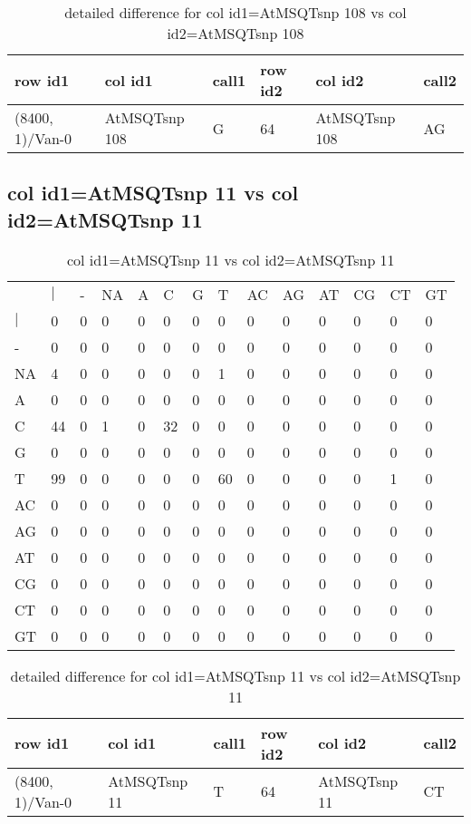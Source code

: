 \begin{center}
\begin{longtable}{|l|l|l|l|l|l|}
\caption{detailed difference for col id1=AtMSQTsnp 108 vs col id2=AtMSQTsnp 108} \label{table_dm495}\\
\hline
row id1&col id1&call1&row id2&col id2&call2\\
\hline
(8400, 1)/Van-0&AtMSQTsnp 108&G&64&AtMSQTsnp 108&AG\\
\hline
\end{longtable}
\end{center}

\subsection{col id1=AtMSQTsnp 11 vs col id2=AtMSQTsnp 11}
\begin{center}
\begin{longtable}{|l|l|l|l|l|l|l|l|l|l|l|l|l|l|}
\caption{col id1=AtMSQTsnp 11 vs col id2=AtMSQTsnp 11} \label{table_dm496}\\
\hline
\\
\hline
&$|$&-&NA&A&C&G&T&AC&AG&AT&CG&CT&GT\\
$|$&0&0&0&0&0&0&0&0&0&0&0&0&0\\
-&0&0&0&0&0&0&0&0&0&0&0&0&0\\
NA&4&0&0&0&0&0&1&0&0&0&0&0&0\\
A&0&0&0&0&0&0&0&0&0&0&0&0&0\\
C&44&0&1&0&32&0&0&0&0&0&0&0&0\\
G&0&0&0&0&0&0&0&0&0&0&0&0&0\\
T&99&0&0&0&0&0&60&0&0&0&0&1&0\\
AC&0&0&0&0&0&0&0&0&0&0&0&0&0\\
AG&0&0&0&0&0&0&0&0&0&0&0&0&0\\
AT&0&0&0&0&0&0&0&0&0&0&0&0&0\\
CG&0&0&0&0&0&0&0&0&0&0&0&0&0\\
CT&0&0&0&0&0&0&0&0&0&0&0&0&0\\
GT&0&0&0&0&0&0&0&0&0&0&0&0&0\\
\hline
\end{longtable}
\end{center}

\begin{center}
\begin{longtable}{|l|l|l|l|l|l|}
\caption{detailed difference for col id1=AtMSQTsnp 11 vs col id2=AtMSQTsnp 11} \label{table_dm497}\\
\hline
row id1&col id1&call1&row id2&col id2&call2\\
\hline
(8400, 1)/Van-0&AtMSQTsnp 11&T&64&AtMSQTsnp 11&CT\\
\hline
\end{longtable}
\end{center}

